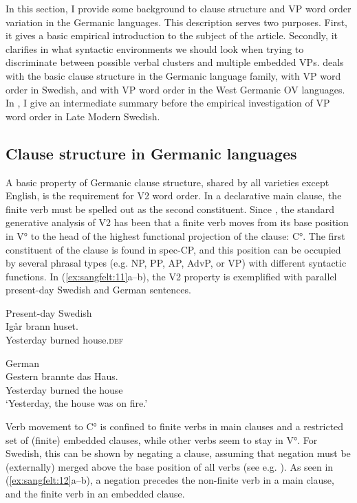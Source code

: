 \documentclass[output=paper, colorlinks, citecolor=brown]{langscibook}
\begin{document}
In this section, I provide some background to clause structure and VP word order variation in the Germanic languages. This description serves two purposes. First, it gives a basic empirical introduction to the subject of the article. Secondly, it clarifies in what syntactic environments we should look when trying to discriminate between possible verbal clusters and multiple embedded VPs.  deals with the basic clause structure in the Germanic language family,  with VP word order in Swedish, and  with VP word order in the West Germanic OV languages. In , I give an intermediate summary before the empirical investigation of VP word order in Late Modern Swedish.

\subsection{Clause structure in Germanic languages}\label{sec:sangfelt:3.1}

A basic property of Germanic clause structure, shared by all varieties except English, is the requirement for V2 word order. In a declarative main clause, the finite verb must be spelled out as the second constituent. Since \citet{denBesten1983}, the standard generative analysis of V2 has been that a finite verb moves from its base position in V° to the head of the highest functional projection of the clause: C°. The first constituent of the clause is found in spec-CP, and this position can be occupied by several phrasal types (e.g. NP, PP, AP, AdvP, or VP) with different syntactic functions. In (\ref{ex:sangfelt:11}a–b), the V2 property is exemplified with parallel present-day Swedish and German sentences.

\ea
\label{ex:sangfelt:11}
\ea Present-day Swedish\\
\gll Igår brann huset. \\
 Yesterday burned house.\textsc{def}\\\label{ex:sangfelt:11a} 
 
\ex German\\
\gll Gestern brannte das Haus.\\
 Yesterday burned the house\\
\glt ‘Yesterday, the house was on fire.’\label{ex:sangfelt:11b}
\z 
\z 

Verb movement to C° is confined to finite verbs in main clauses and a restricted set of (finite) embedded clauses, while other verbs seem to stay in V°. For Swedish, this can be shown by negating a clause, assuming that negation must be (externally) merged above the base position of all verbs (see e.g. \citealt{Zeijlstra2013}). As seen in (\ref{ex:sangfelt:12}a–b), a negation precedes the non-finite verb in a main clause, and the finite verb in an embedded clause.
\end{document}

